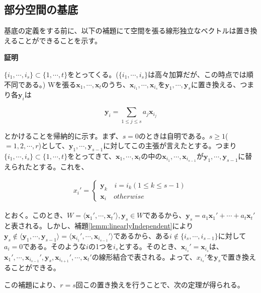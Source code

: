 \documentclass[dvipdfmx,autodetect-engine]{jsarticle}
\begin{document}
\subsection{部分空間の基底}

基底の定義をする前に、以下の補題にて空間を張る線形独立なベクトルは置き換えることができることを示す。

\label{lemm:basisReplacing}

{\bf 証明}

$\{i_1, \cdots, i_s\} \subset \{1, \cdots, t\}$をとってくる。($\{i_1, \cdots, i_s\}$は高々加算だが、この時点では順不同である。) Wを張る$\bm{x}_1, \cdots, \bm{x}_t$のうち、$\bm{x}_{i_1}, \cdots, \bm{x}_{i_s}$を$\bm{y}_1, \cdots, \bm{y}_s$に置き換える、つまり各$\bm{y}_i$は

$$
\bm{y}_i = \sum_{1 \leq j \leq s} a_j\bm{x}_{i_j}
$$

とかけることを帰納的に示す。まず、$s = 0$のときは自明である。$s \geq 1$($= 1, 2, \cdots, r$)として、$\bm{y}_1, \cdots, \bm{y}_{s-1}$に対してこの主張が言えたとする。つまり$\{i_1, \cdots, i_s\} \subset \{1, \cdots, t\}$をとってきて、$\bm{x}_1, \cdots, \bm{x}_t$の中の$\bm{x}_{i_1}, \cdots, \bm{x}_{i_{s-1}}$が$\bm{y}_1, \cdots, \bm{y}_{s-1}$に替えられたとする。これを、

\begin{eqnarray*}
  x_i' = \left\{
    \begin{array}{l}
      \bm{y}_k \quad i = i_k (1 \leq k \leq s -1) \\
      \bm{x}_i \quad otherwise
    \end{array}
  \right.
\end{eqnarray*}

とおく。このとき、$W = \langle \bm{x}_1', \cdots, \bm{x}_t' \rangle, \bm{y}_s \in W$であるから、$\bm{y}_s = a_1\bm{x}_1' + \cdots + a_t\bm{x}_t'$と表される。しかし、補題\ref{lemm:linearlyIndependent}により$\bm{y}_s \notin \langle \bm{y}_1, \cdots, \bm{y}_{s-1} \rangle = \langle \bm{x}_{i_1}', \cdots, \bm{x}_{i_{s-1}}' \rangle$であるから、ある$i \notin \{i_s, \cdots, i_{s-1} \}$に対して$a_i = 0$である。そのような$i$の1つを$i_s$とする。そのとき、$\bm{x}_{i_s}' = \bm{x}_{i_s}$は、$\bm{x}_1', \cdots, \bm{x}_{i_{s-1}}', \bm{y}_s, \bm{x}_{i_{s + 1}}', \cdots, \bm{x}_t'$の線形結合で表される。よって、$x_{i_s}'$を$\bm{y}_s$で置き換えることができる。

この補題により、$r = s$回この置き換えを行うことで、次の定理が得られる。
\end{document}

